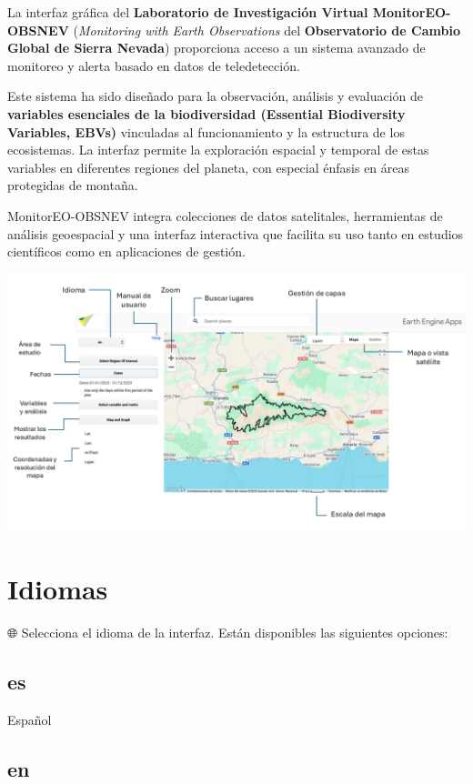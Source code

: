 \documentclass[
]{book}
\begin{document}
La interfaz gráfica del \textbf{Laboratorio de Investigación Virtual MonitorEO-OBSNEV} (\emph{Monitoring with Earth Observations} del \textbf{Observatorio de Cambio Global de Sierra Nevada}) proporciona acceso a un sistema avanzado de monitoreo y alerta basado en datos de teledetección.

Este sistema ha sido diseñado para la observación, análisis y evaluación de \textbf{variables esenciales de la biodiversidad (Essential Biodiversity Variables, EBVs)} vinculadas al funcionamiento y la estructura de los ecosistemas. La interfaz permite la exploración espacial y temporal de estas variables en diferentes regiones del planeta, con especial énfasis en áreas protegidas de montaña.

MonitorEO-OBSNEV integra colecciones de datos satelitales, herramientas de análisis geoespacial y una interfaz interactiva que facilita su uso tanto en estudios científicos como en aplicaciones de gestión.

\includegraphics{assets/InterfazMonitorEO_es.png}

\chapter{Idiomas}\label{idiomas}

🌐 Selecciona el idioma de la interfaz. Están disponibles las siguientes opciones:

\section{es}\label{es}

Español

\section{en}\label{en}
\end{document}
